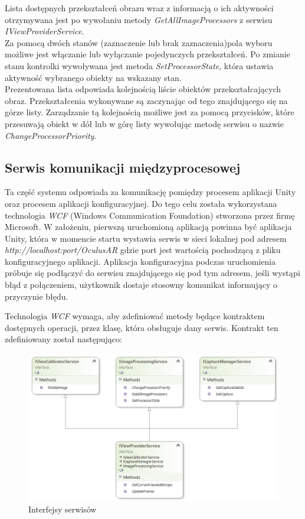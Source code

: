 \documentclass[a4paper,11pt,twoside]{report}
\theoremstyle{definition}
\begin{document}
\begin{description}
Lista dostępnych przekształceń obrazu wraz z informacją o ich aktywności otrzymywana jest po wywołaniu metody \textit{GetAllImageProcessors} z serwisu \textit{IViewProviderService}. \\
Za pomocą dwóch stanów (zaznaczenie lub brak zaznaczenia)pola wyboru możliwe jest włączanie lub wyłączanie pojedynczych przekształceń. Po zmianie stanu kontrolki wywoływana jest metoda \textit{SetProcessorState}, która ustawia aktywność wybranego obiekty na wskazany stan. \\
Prezentowana lista odpowiada kolejnością liście obiektów przekształcających obraz.  Przekształcenia wykonywane są zaczynając od tego znajdującego się na górze listy. Zarządzanie tą kolejnością możliwe jest za pomocą przycisków, które przesuwają obiekt w dół lub w górę listy wywołując metodę serwisu o nazwie \textit{ChangeProcessorPriority}.

\end{description}

\subsection{Serwis komunikacji międzyprocesowej}

Ta część systemu odpowiada za komunikację pomiędzy procesem aplikacji Unity oraz procesem aplikacji konfiguracyjnej.  Do tego celu została wykorzystana technologia \textit{WCF}  (Windows Communication Foundation) stworzona przez firmę Microsoft. W założeniu, pierwszą uruchomioną aplikacją powinna być aplikacja Unity, która w momencie startu wystawia serwis w sieci lokalnej pod adresem \textit{http://localhost:{port}/OculusAR} gdzie port jest wartością pochodzącą z pliku konfiguracyjnego aplikacji. Aplikacja konfiguracyjna podczas uruchomienia próbuje się podłączyć do serwisu znajdującego się pod tym adresem, jeśli wystąpi błąd z połączeniem, użytkownik dostaje stosowny komunikat informujący o przyczynie błędu. 

Technologia \textit{WCF} wymaga, aby zdefiniować metody będące kontraktem dostępnych operacji, przez klasę, która obsługuje dany serwis. Kontrakt ten zdefiniowany został następująco:
\begin{figure}[h]
\centering
\includegraphics[scale=0.9]{images/IViewProviderService}
\caption[Serwisy diagram]{Interfejsy serwisów}
\end{figure}
 
\end{document}
